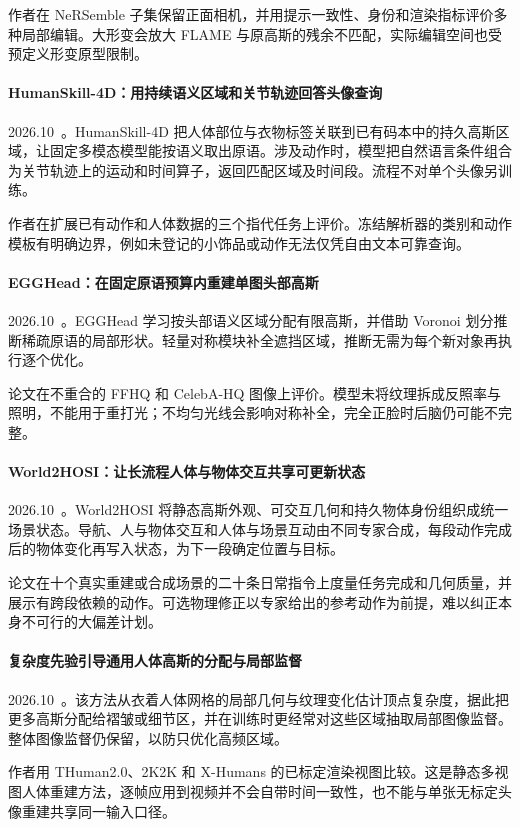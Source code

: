 作者在 NeRSemble 子集保留正面相机，并用提示一致性、身份和渲染指标评价多种局部编辑。大形变会放大 FLAME 与原高斯的残余不匹配，实际编辑空间也受预定义形变原型限制。

\paragraph{HumanSkill-4D：用持续语义区域和关节轨迹回答头像查询}
2026.10~\cite{2610_24452}。HumanSkill-4D 把人体部位与衣物标签关联到已有码本中的持久高斯区域，让固定多模态模型能按语义取出原语。涉及动作时，模型把自然语言条件组合为关节轨迹上的运动和时间算子，返回匹配区域及时间段。流程不对单个头像另训练。

作者在扩展已有动作和人体数据的三个指代任务上评价。冻结解析器的类别和动作模板有明确边界，例如未登记的小饰品或动作无法仅凭自由文本可靠查询。

\paragraph{EGGHead：在固定原语预算内重建单图头部高斯}
2026.10~\cite{2610_26898}。EGGHead 学习按头部语义区域分配有限高斯，并借助 Voronoi 划分推断稀疏原语的局部形状。轻量对称模块补全遮挡区域，推断无需为每个新对象再执行逐个优化。

论文在不重合的 FFHQ 和 CelebA-HQ 图像上评价。模型未将纹理拆成反照率与照明，不能用于重打光；不均匀光线会影响对称补全，完全正脸时后脑仍可能不完整。

\paragraph{World2HOSI：让长流程人体与物体交互共享可更新状态}
2026.10~\cite{2610_27725}。World2HOSI 将静态高斯外观、可交互几何和持久物体身份组织成统一场景状态。导航、人与物体交互和人体与场景互动由不同专家合成，每段动作完成后的物体变化再写入状态，为下一段确定位置与目标。

论文在十个真实重建或合成场景的二十条日常指令上度量任务完成和几何质量，并展示有跨段依赖的动作。可选物理修正以专家给出的参考动作为前提，难以纠正本身不可行的大偏差计划。

\paragraph{复杂度先验引导通用人体高斯的分配与局部监督}
2026.10~\cite{2610_35152}。该方法从衣着人体网格的局部几何与纹理变化估计顶点复杂度，据此把更多高斯分配给褶皱或细节区，并在训练时更经常对这些区域抽取局部图像监督。整体图像监督仍保留，以防只优化高频区域。

作者用 THuman2.0、2K2K 和 X-Humans 的已标定渲染视图比较。这是静态多视图人体重建方法，逐帧应用到视频并不会自带时间一致性，也不能与单张无标定头像重建共享同一输入口径。
